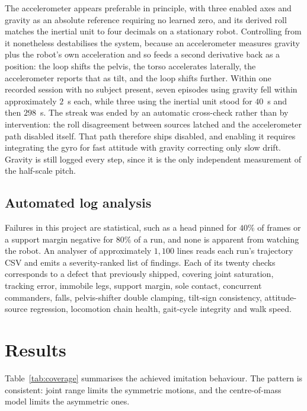 \documentclass[twocolumn]{article}
\begin{document}
The accelerometer appears preferable in principle, with three enabled axes and gravity as an
absolute reference requiring no learned zero, and its derived roll matches the inertial unit to
four decimals on a stationary robot. Controlling from it nonetheless destabilises the system,
because an accelerometer measures gravity plus the robot's own acceleration and so feeds a
second derivative back as a position: the loop shifts the pelvis, the torso accelerates
laterally, the accelerometer reports that as tilt, and the loop shifts further. Within one
recorded session with no subject present, seven episodes using gravity fell within
approximately $2$~s each, while three using the inertial unit stood for $40$~s and then
$298$~s. The streak was ended by an automatic cross-check rather than by intervention: the roll
disagreement between sources latched and the accelerometer path disabled itself. That path
therefore ships disabled, and enabling it requires integrating the gyro for fast attitude with
gravity correcting only slow drift. Gravity is still logged every step, since it is the only
independent measurement of the half-scale pitch.

\subsection{Automated log analysis}

Failures in this project are statistical, such as a head pinned for $40\%$ of
frames or a support margin negative for $80\%$ of a run, and none is apparent from watching the
robot. An analyser of approximately $1{,}100$ lines reads each run's trajectory CSV and emits a
severity-ranked list of findings. Each of its twenty checks corresponds to a defect that
previously shipped, covering joint saturation, tracking error, immobile legs, support margin,
sole contact, concurrent commanders, falls, pelvis-shifter double clamping, tilt-sign
consistency, attitude-source regression, locomotion chain health, gait-cycle integrity and walk
speed.

\section{Results}

Table~\ref{tab:coverage} summarises the achieved imitation behaviour. The pattern is
consistent: joint range limits the symmetric motions, and the centre-of-mass model limits the
asymmetric ones.
\end{document}
